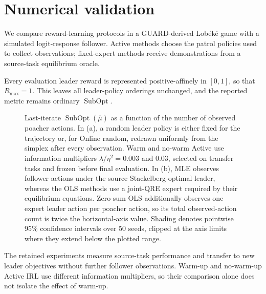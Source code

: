 \section{Numerical validation}

We compare reward-learning protocols in a GUARD-derived Lob\'ek\'e game with a
simulated logit-response follower. Active methods choose the patrol policies
used to collect observations; fixed-expert methods receive demonstrations from
a source-task equilibrium oracle.

Every evaluation leader reward is represented positive-affinely in $[0,1]$,
so that $R_{\max}=1$. This leaves all leader-policy orderings unchanged, and
the reported metric remains ordinary $\operatorname{SubOpt}$.

\begin{figure}[t]
  \centering
  \resizebox{\textwidth}{!}{%
  }
  \caption{Last-iterate $\operatorname{SubOpt}(\hat\mu)$ as a function of
  the number of observed poacher actions. In (a), a random leader policy is
  either fixed for the trajectory or, for Online random, redrawn uniformly from
  the simplex after every observation. Warm and no-warm Active use information
  multipliers $\lambda/\eta^2=0.003$ and $0.03$, selected on transfer tasks and
  frozen before final evaluation. In (b), MLE observes
  follower actions under the source Stackelberg-optimal leader, whereas the OLS
  methods use a joint-QRE expert required by their equilibrium equations.
  Zero-sum OLS additionally observes one expert leader action per poacher action,
  so its total observed-action count is twice the horizontal-axis value. Shading
  denotes pointwise 95\% confidence intervals over 50 seeds, clipped at the axis
  limits where they extend below the plotted range.}
  \label{fig:source-convergence}
\end{figure}

The retained experiments measure source-task performance and transfer to new
leader objectives without further follower observations. Warm-up and no-warm-up
Active IRL use different information multipliers, so their comparison alone
does not isolate the effect of warm-up.

